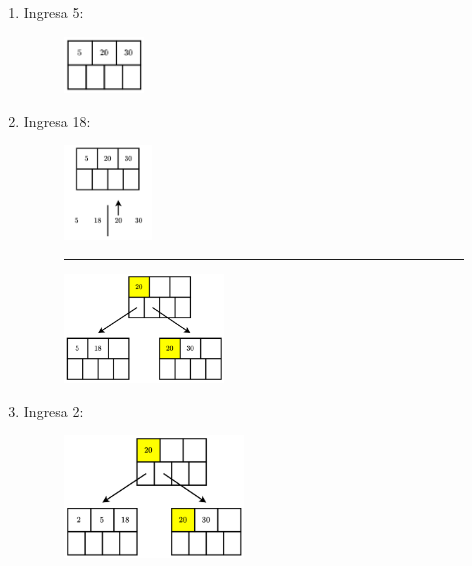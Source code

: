 \documentclass{templateNote}
\begin{document}
\begin{itemize}
\begin{enumerate}
\begin{enumerate}
\begin{enumerate}
                \item Ingresa 5:
                \begin{figure}[H]
                    \centering
                    \includegraphics[width=0.2\textwidth]{diagram/P3-1-3.png}
                \end{figure}

                \item Ingresa 18:
                \begin{figure}[H]
                    \centering
                    \includegraphics[width=0.22\textwidth]{diagram/P3-1-4-1.png}
                    \rule{\textwidth}{1pt}
                    \includegraphics[width=0.40\textwidth]{diagram/P3-1-4-2.png}
                \end{figure}

                \newpage
                \item Ingresa 2:
                \begin{figure}[H]
                    \centering
                    \includegraphics[width=0.45\textwidth]{diagram/P3-1-5.png}
                \end{figure}


\end{enumerate}
\end{enumerate}
\end{enumerate}
\end{itemize}
\end{document}
